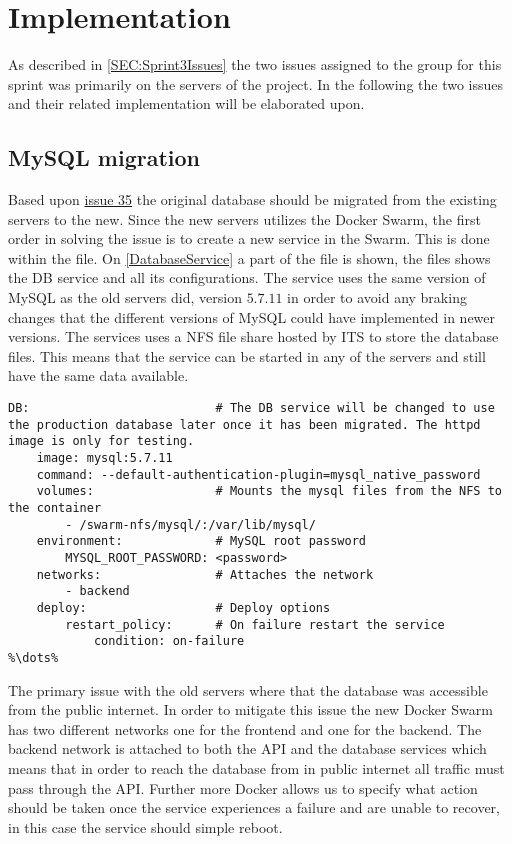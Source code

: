 \section{Implementation}
As described in \autoref{SEC:Sprint3Issues} the two issues assigned to the group for this sprint was primarily on the servers of the project. 
In the following the two issues and their related implementation will be elaborated upon.

\subsection{MySQL migration}
Based upon \href{https://github.com/aau-giraf/wiki/issues/35}{issue 35} the original database should be migrated from the existing servers to the new. 
Since the new servers utilizes the Docker Swarm, the first order in solving the issue is to create a new service in the Swarm. This is done within the  file. 
On \autoref{DatabaseService} a part of the file is shown, the files shows the DB service and all its configurations. 
The service uses the same version of MySQL as the old servers did, version $5.7.11$ in order to avoid any braking changes that the different versions of MySQL could have implemented in newer versions. 
The services uses a NFS file share hosted by ITS to store the database files. 
This means that the service can be started in any of the servers and still have the same data available. 

\begin{lstlisting}[caption={Docker database service},captionpos=b,label=DatabaseService,escapechar=\%]
%\dots%
DB:                          # The DB service will be changed to use the production database later once it has been migrated. The httpd image is only for testing.
    image: mysql:5.7.11
    command: --default-authentication-plugin=mysql_native_password
    volumes:                 # Mounts the mysql files from the NFS to the container
        - /swarm-nfs/mysql/:/var/lib/mysql/
    environment:             # MySQL root password
        MYSQL_ROOT_PASSWORD: <password>
    networks:                # Attaches the network
        - backend
    deploy:                  # Deploy options
        restart_policy:      # On failure restart the service
            condition: on-failure
%\dots%
\end{lstlisting}

The primary issue with the old servers where that the database was accessible from the public internet.
In order to mitigate this issue the new Docker Swarm has two different networks one for the frontend and one for the backend. 
The backend network is attached to both the API and the database services which means that in order to reach the database from in public internet all traffic must pass through the API. 
Further more Docker allows us to specify what action should be taken once the service experiences a failure and are unable to recover, in this case the service should simple reboot. 

